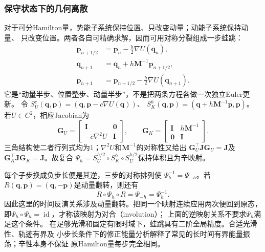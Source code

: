 \subsubsection{保守状态下的几何离散}

对于可分Hamilton量，势能子系统保持位置、只改变动量；动能子系统保持动量、
只改变位置。两者各自可精确求解，因而可用对称分裂组成一步蛙跳：
\begin{align}
  \bm p_{n+1/2}&=\bm p_n-\frac h2\nabla U(\bm q_n),
    \label{eq:dynamical-leapfrog-half-momentum}\\
  \bm q_{n+1}&=\bm q_n+h\bm M^{-1}\bm p_{n+1/2},
    \label{eq:dynamical-leapfrog-position}\\
  \bm p_{n+1}&=\bm p_{n+1/2}-\frac h2\nabla U(\bm q_{n+1}).
    \label{eq:dynamical-leapfrog-final-momentum}
\end{align}
它是“动量半步、位置整步、动量半步”，不是把两条方程各做一次独立Euler更新。
令
$S_U^c(\bm q,\bm p)=(\bm q,\bm p-c\nabla U(\bm q))$、
$S_K^h(\bm q,\bm p)=(\bm q+h\bm M^{-1}\bm p,\bm p)$。
若$U\in C^2$，相应Jacobian为
\[
  \bm G_U=\begin{bmatrix}\bm I&\bm0\\-c\nabla^2U&\bm I\end{bmatrix},
  \qquad
  \bm G_K=\begin{bmatrix}\bm I&h\bm M^{-1}\\\bm0&\bm I\end{bmatrix}.
\]
三角结构使二者行列式均为$1$；$\nabla^2U$和$\bm M^{-1}$的对称性又给出
$\bm G_U^\top\bm J\bm G_U=\bm J$及
$\bm G_K^\top\bm J\bm G_K=\bm J$。故复合
$\Psi_h=S_U^{h/2}\circ S_K^h\circ S_U^{h/2}$保持体积且为辛映射。

每个子步换成负步长便是其逆，三步的对称排列使
$\Psi_h^{-1}=\Psi_{-h}$。若$R(\bm q,\bm p)=(\bm q,-\bm p)$是动量翻转，则还有
\[
  R\circ\Psi_h\circ R=\Psi_{-h}=\Psi_h^{-1}.
\]
因此这里的时间反演关系涉及动量翻转。把同一个映射连续应用两次便回到原态，
即$\Psi_h\circ\Psi_h=\operatorname{id}$，才称该映射为对合（involution）；
上面的逆映射关系不要求$\Psi_h$满足这个条件。
在足够光滑和固定有限时域下，蛙跳具有二阶全局精度。合适光滑性、轨迹有界及
小步长条件下的修正能量分析解释了常见的长时间有界能量振荡；辛性本身不保证
原Hamilton量每步完全相同。

